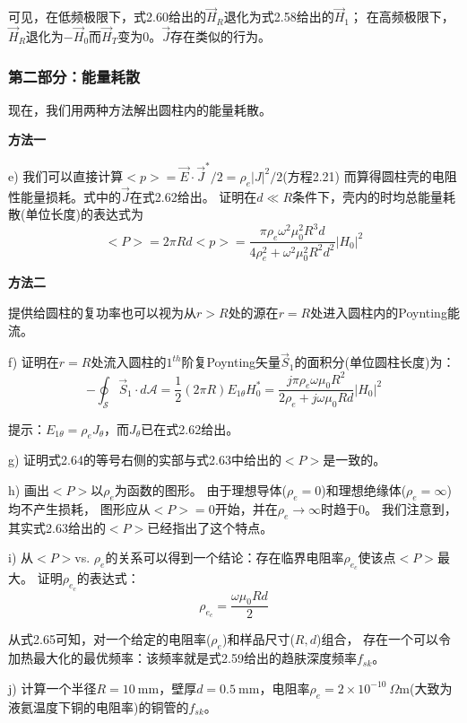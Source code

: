 可见，在低频极限下，式2.60给出的$\vec{H}_R$退化为式2.58给出的$\vec{H}_1$；
在高频极限下，$\vec{H}_R$退化为$-\vec{H}_0$而$\vec{H}_T$变为$0$。$\vec{J}$存在类似的行为。

\subsubsection*{第二部分：能量耗散}
现在，我们用两种方法解出圆柱内的能量耗散。

\textbf{方法一}

e) 我们可以直接计算$<p>=\vec{E}\cdot \vec{J}^* /2=\rho_e |J|^2 /2$(方程2.21)
而算得圆柱壳的电阻性能量损耗。式中的$\vec{J}$在式2.62给出。
证明在$d\ll R$条件下，壳内的时均总能量耗散(单位长度)的表达式为
\begin{equation}
<P>=2\pi R d<p>=\frac{\pi \rho_e \omega^2 \mu_0^2 R^3 d}{4\rho_e^2+\omega^2\mu_0^2 R^2 d^2} |H_0|^2
\end{equation}

\textbf{方法二}

提供给圆柱的复功率也可以视为从$r>R$处的源在$r=R$处进入圆柱内的Poynting能流。

f) 证明在$r=R$处流入圆柱的$1^{th}$阶复Poynting矢量$\vec{S}_1$的面积分(单位圆柱长度)为：
\begin{equation}
-\oint_{\mathcal{S}}\vec{S}_1 \cdot d\mathcal{A}=\frac{1}{2}(2\pi R)E_{1\theta} H_0^*=\frac{j\pi\rho_e\omega\mu_0 R^2}{2\rho_e+j\omega\mu_0 R d}|H_0|^2
\end{equation}

提示：$E_{1\theta}=\rho_e J_\theta$，而$J_\theta$已在式2.62给出。

g) 证明式2.64的等号右侧的实部与式2.63中给出的$<P>$是一致的。

h) 画出$<P>$以$\rho_e$为函数的图形。
由于理想导体($\rho_e=0$)和理想绝缘体($\rho_e=\infty$)均不产生损耗，
图形应从$<P>=0$开始，并在$\rho_e \rightarrow \infty$时趋于0。
我们注意到，其实式2.63给出的$<P>$已经指出了这个特点。

i) 从$<P>$vs. $\rho_e$的关系可以得到一个结论：存在临界电阻率$\rho_{e_c}$使该点$<P>$最大。
证明$\rho_{e_c}$的表达式：
\begin{equation}
\rho_{e_c}=\frac{\omega \mu_0 R d}{2}
\end{equation}

从式2.65可知，对一个给定的电阻率($\rho_e$)和样品尺寸($R,d$)组合，
存在一个可以令加热最大化的最优频率：该频率就是式2.59给出的趋肤深度频率$f_{sk}$。

j) 计算一个半径$R=10\ \mathrm{mm}$，壁厚$d=0.5\ \mathrm{mm}$，电阻率$\rho_e=2\times 10^{-10}\ \Omega\mathrm{m}$(大致为液氦温度下铜的电阻率)的铜管的$f_{sk}$。

